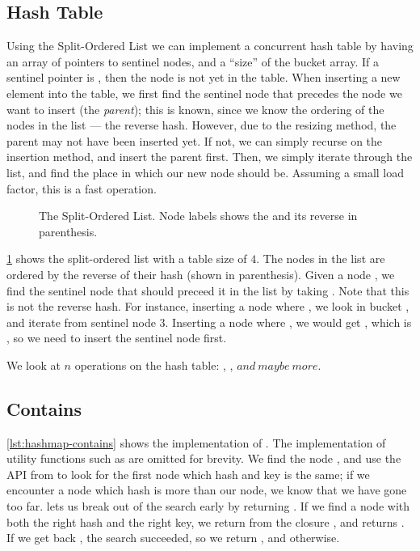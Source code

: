 \subsection{Hash Table}

Using the Split-Ordered List we can implement a concurrent hash table by having an array of
pointers to sentinel nodes, and a ``size'' of the bucket array. If a sentinel pointer is
, then the node is not yet in the table. When inserting a new element into the table, we
first find the sentinel node that precedes the node we want to insert (the \emph{parent}); this is
known, since we know the ordering of the nodes in the list --- the reverse hash. However, due to
the resizing method, the parent may not have been inserted yet. If not, we can simply recurse on
the insertion method, and insert the parent first. Then, we simply iterate through the list, and
find the place in which our new node should be. Assuming a small load factor, this is a fast
operation.

\begin{figure}[ht]
\centering

\caption{The Split-Ordered List. Node labels shows the  and its reverse in
parenthesis.\label{fig:split-order-list}}
\end{figure}

\cref{fig:split-order-list} shows the split-ordered list with a table size of $4$. The nodes in the
list are ordered by the reverse of their hash (shown in parenthesis). Given a node , we
find the sentinel node that should preceed it in the list by taking .
Note that this is not the reverse hash. For instance,
inserting a node where , we look in bucket , and iterate from
sentinel node 3.
Inserting a node where , we would get , which is ,
so we need to insert the sentinel node first.


We look at $n$ operations on the hash table: , , $and\ maybe\ more$.

\subsection{Contains}

\cref{lst:hashmap-contains} shows the implementation of . The
implementation of utility functions such as  are omitted for brevity.  We
find the  node , and use the  API from 
 to look for the first node which hash and key is the same; if we encounter a node
which hash is more than our node, we know that we have gone too far. 
lets us break out of the search early by returning  . If we find a node
with both the right hash and the right key, we return  from the
closure , and  returns . If we get back , the
search succeeded, so we return , and  otherwise.


